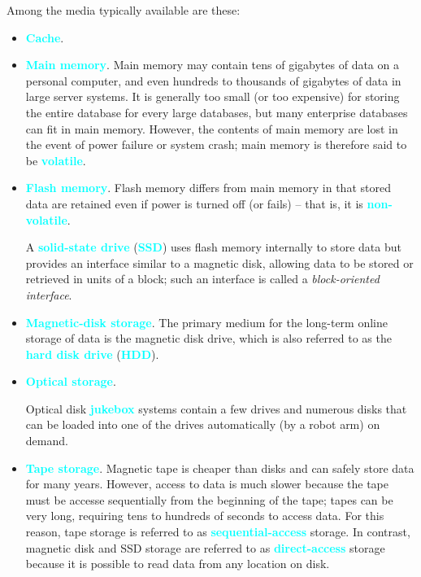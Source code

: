 \documentclass[a4paper,12pt,twoside,openany]{book}
\newcommand{\textcy}[1]{\textbf{\textcolor{cyan}{#1}}}
\begin{document}
Among the media typically available are these:
\begin{itemize}
    \item \textcy{Cache}.
    \item \textcy{Main memory}. Main memory may contain tens of gigabytes of data on a personal computer, and even hundreds to thousands of gigabytes of data in large server systems. It is generally too small (or too expensive) for storing the entire database for every large databases, but many enterprise databases can fit in main memory. However, the contents of main memory are lost in the event of power failure or system crash; main memory is therefore said to be \textcy{volatile}.
    \item \textcy{Flash memory}. Flash memory differs from main memory in that stored data are retained even if power is turned off (or fails) -- that is, it is \textcy{non-volatile}.
    
    A \textcy{solid-state drive} (\textcy{SSD}) uses flash memory internally to store data but provides an interface similar to a magnetic disk, allowing data to be stored or retrieved in units of a block; such an interface is called a \textit{block-oriented interface}.
    \item \textcy{Magnetic-disk storage}. The primary medium for the long-term online storage of data is the magnetic disk drive, which is also referred to as the \textcy{hard disk drive} (\textcy{HDD}).
    \item \textcy{Optical storage}.
    
    Optical disk \textcy{jukebox} systems contain a few drives and numerous disks that can be loaded into one of the drives automatically (by a robot arm) on demand.
    \item \textcy{Tape storage}. Magnetic tape is cheaper than disks and can safely store data for many years. However, access to data is much slower because the tape must be accesse sequentially from the beginning of the tape; tapes can be very long, requiring tens to hundreds of seconds to access data. For this reason, tape storage is referred to as \textcy{sequential-access} storage. In contrast, magnetic disk and SSD storage are referred to as \textcy{direct-access} storage because it is possible to read data from any location on disk.
\end{itemize}
\end{document}
